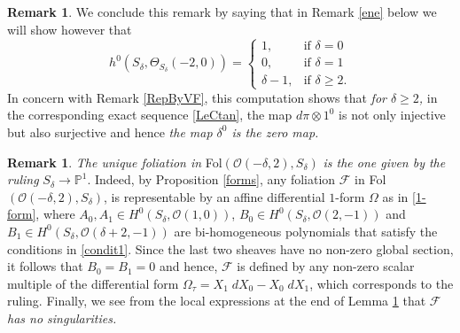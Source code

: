\documentclass{amsart} %
\theoremstyle{definition}
\newtheorem{remark}[theorem]{Remark}
\newcommand{\mcO}{\mathcal{O}}
\newcommand{\mcF}{\mathcal{F}}
\begin{document}
\begin{remark}
We conclude this remark by saying that in  Remark \ref{ene} below we will show however that
$$
h^0(S_{\delta}, \Theta_{S_{\delta}}(-2, 0) )
 = \begin{cases}
     1, & \mbox{if } \delta = 0 \\
     0, & \mbox{if } \delta = 1 \\
     \delta-1, & \mbox{if } \delta \geq 2.
   \end{cases}
$$
In concern with Remark \ref{RepByVF}, this computation shows that
\textit{for $ \delta \geq 2 $,} in the corresponding exact sequence \eqref{LeCtan}, the map
$ d\pi \otimes 1^0 $ is not only injective but also surjective and hence
\textit{the map $ \delta^0 $ is the zero map.}
\end{remark}

\begin{remark}\label{tau}
{\it The unique foliation in} \textrm{Fol}$(\mcO(-\delta,2), S_{\delta})$
{\it is the one given by the ruling}
$S_{\delta}\rightarrow \mathbb{P}^1$. Indeed, by Proposition \ref{forms}, any foliation $\mathcal F$ in
\textrm{Fol}$(\mcO(-\delta,2), S_{\delta})$, is representable by an
affine differential $1$-form $ \Omega $ as in \eqref{1-form},
 where
 $ A_0,A_1 \in H^0( S_{\delta}, \mcO(1,0) ) $,
 $ B_0 \in H^0( S_{\delta}, \mcO(2,-1) ) $ and
 $ B_1 \in H^0( S_{\delta}, \mcO(\delta+2,-1) ) $
 are bi-homogeneous polynomials
that satisfy the conditions in \eqref{condit1}.
Since the last two sheaves have no non-zero global section, it follows that $B_0=B_1=0$ and
hence, $\mathcal F$ is defined by any non-zero scalar multiple of the differential form
$ \Omega_{\tau} = X_1\;dX_0-X_0\; dX_1 $, which corresponds to the ruling. Finally, we see
from the local expressions at the end of Lemma \ref{tau} that $ \mcF $ {\it has no singularities.}
\end{remark}
\end{document}
